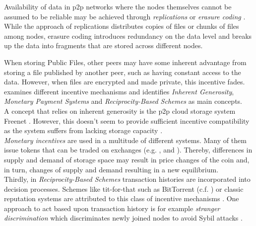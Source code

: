 \documentclass{article}
\begin{document}
Availability of data in p2p networks where the nodes themselves cannot be assumed to be reliable may be achieved through \emph{replications} or \emph{erasure coding} \citep{Weatherspoon.2002}. While the approach of replications distributes copies of files or chunks of files among nodes, erasure coding introduces redundancy on the data level and breaks up the data into fragments that are stored across different nodes. 
\\\vspace{0.5em}

When storing Public Files, other peers may have some inherent advantage from storing a file published by another peer, such as having constant access to the data. However, when files are encrypted and made private, this incentive fades. 
\\
\cite{Feldman.2005} examines different incentive mechanisms and identifies \emph{Inherent Generosity}, \emph{Monetary Payment Systems} and \emph{Reciprocity-Based Schemes} as main concepts.\\
A concept that relies on inherent generosity is the p2p cloud storage system Freenet \citep{Clarke.2001}. However, this doesn't seem to provide sufficient incentive compatibility as the system suffers from lacking storage capacity \citep{Kopp.2017}.
\\
\emph{Monetary incentives} are used in a multitude of different systems. Many of them issue tokens that can be traded on exchanges (e.g. \cite{Vorick.2014}, \cite{Wilkinson.2014} and \cite{Lambert.2015}). Thereby, differences in supply and demand of storage space may result in price changes of the coin and, in turn, changes of supply and demand resulting in a new equilibrium. 
\\
Thirdly, in \emph{Reciprocity-Based Schemes} transaction histories are incorporated into decision processes. Schemes like tit-for-that such as BitTorrent (c.f. \cite{Cohen.2003}) or classic reputation systems are attributed to this class of incentive mechanisms \citep{Feldman.2005}. One approach to act based upon transaction history is for example \emph{stranger discrimination} which discriminates newly joined nodes to avoid Sybil attacks \citep{Lai.2003}.
\\\vspace{0.5em}
\end{document}
